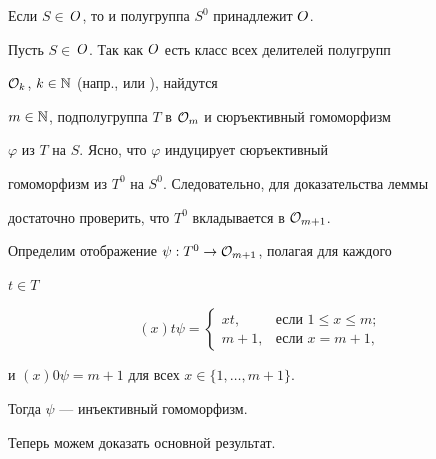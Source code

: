 \begin{lems} \label{odiv8}


Если $S\in$\,$\boldmath{O}$, то и полугруппа $S^0$ принадлежит $\boldmath{O}$.


\end{lems}





\begin{pf}


Пусть $S\in$\,$\boldmath{O}$. Так как $\boldmath{O}$ есть класс всех делителей полугрупп


${\cal O}_k$, $k\in\Bbb N$ (напр., \cite{HIG2} или \cite{V-V}), найдутся


$m\in\Bbb N$, подполугруппа $T$ в ${\cal O}_m$ и сюръективный гомоморфизм


$\varphi$ из $T$ на $S$. Ясно, что $\varphi$ индуцирует сюръективный


гомоморфизм из $T^0$ на $S^0$. Следовательно, для доказательства леммы


достаточно проверить, что $T^0$ вкладывается в ${\cal O}_{m+1}$.


Определим отображение $\psi:T^0\to{\cal O}_{m+1}$, полагая для каждого


$t\in T$


$$


(x)t\psi=


\begin{cases}


xt, &\text{если $1\le x\le m$;}\\


m+1, &\text{если $x=m+1$,}


\end{cases}


$$


и $(x)0\psi=m+1$ для всех $x\in\{1,\dotsc,m+1\}$.


Тогда $\psi$ --- инъективный гомоморфизм.


\end{pf}





Теперь можем доказать основной результат.





